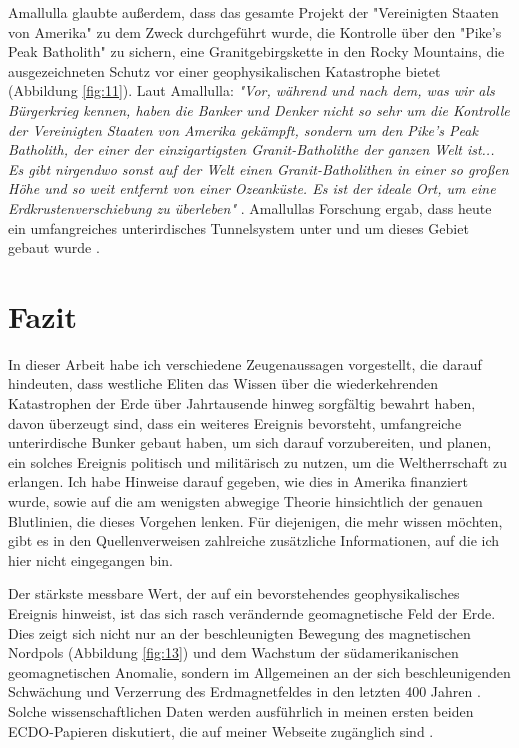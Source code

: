 \documentclass[10pt,twocolumn,letterpaper]{article}
\begin{document}
Amallulla glaubte außerdem, dass das gesamte Projekt der "Vereinigten Staaten von Amerika" zu dem Zweck durchgeführt wurde, die Kontrolle über den "Pike’s Peak Batholith" zu sichern, eine Granitgebirgskette in den Rocky Mountains, die ausgezeichneten Schutz vor einer geophysikalischen Katastrophe bietet (Abbildung \ref{fig:11}). Laut Amallulla: \textit{"Vor, während und nach dem, was wir als Bürgerkrieg kennen, haben die Banker und Denker nicht so sehr um die Kontrolle der Vereinigten Staaten von Amerika gekämpft, sondern um den Pike’s Peak Batholith, der einer der einzigartigsten Granit-Batholithe der ganzen Welt ist... Es gibt nirgendwo sonst auf der Welt einen Granit-Batholithen in einer so großen Höhe und so weit entfernt von einer Ozeanküste. Es ist der ideale Ort, um eine Erdkrustenverschiebung zu überleben"} \cite{33,34}. Amallullas Forschung ergab, dass heute ein umfangreiches unterirdisches Tunnelsystem unter und um dieses Gebiet gebaut wurde \cite{36}.

\section{Fazit}

In dieser Arbeit habe ich verschiedene Zeugenaussagen vorgestellt, die darauf hindeuten, dass westliche Eliten das Wissen über die wiederkehrenden Katastrophen der Erde über Jahrtausende hinweg sorgfältig bewahrt haben, davon überzeugt sind, dass ein weiteres Ereignis bevorsteht, umfangreiche unterirdische Bunker gebaut haben, um sich darauf vorzubereiten, und planen, ein solches Ereignis politisch und militärisch zu nutzen, um die Weltherrschaft zu erlangen. Ich habe Hinweise darauf gegeben, wie dies in Amerika finanziert wurde, sowie auf die am wenigsten abwegige Theorie hinsichtlich der genauen Blutlinien, die dieses Vorgehen lenken. Für diejenigen, die mehr wissen möchten, gibt es in den Quellenverweisen zahlreiche zusätzliche Informationen, auf die ich hier nicht eingegangen bin.

Der stärkste messbare Wert, der auf ein bevorstehendes geophysikalisches Ereignis hinweist, ist das sich rasch verändernde geomagnetische Feld der Erde. Dies zeigt sich nicht nur an der beschleunigten Bewegung des magnetischen Nordpols (Abbildung \ref{fig:13}) und dem Wachstum der südamerikanischen geomagnetischen Anomalie, sondern im Allgemeinen an der sich beschleunigenden Schwächung und Verzerrung des Erdmagnetfeldes in den letzten 400 Jahren \cite{3}. Solche wissenschaftlichen Daten werden ausführlich in meinen ersten beiden ECDO-Papieren diskutiert, die auf meiner Webseite zugänglich sind \cite{3}.
\end{document}
